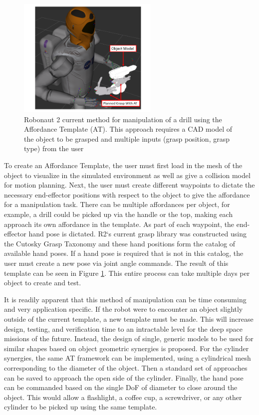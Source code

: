 \documentclass[runningheads,a4paper]{llncs}
\begin{document}
   \begin{figure}[t]
      \centering
      \includegraphics[width=0.6\textwidth]{drill_at2}
      \caption{Robonaut 2 current method for manipulation of a drill using the Affordance Template (AT).  This approach requires a CAD model of the object to be grasped and multiple inputs (grasp position, grasp type) from the user}
      \label{at_example}
   \end{figure}

To create an Affordance Template, the user must first load in the mesh of the object to visualize in the simulated environment as well as give a collision model for motion planning. Next, the user must create different waypoints to dictate the necessary end-effector positions with respect to the object to give the affordance for a manipulation task. There can be multiple affordances per object, for example, a drill could be picked up via the handle or the top, making each approach its own affordance in the template. As part of each waypoint, the end-effector hand pose is dictated. R2`s current grasp library was constructed using the Cutosky Grasp Taxonomy \cite{Cutkosky} and these hand positions form the catalog of available hand poses. If a hand pose is required that is not in this catalog, the user must create a new pose via joint angle commands. The result of this template can be seen in Figure \ref{at_example}. This entire process can take multiple days per object to create and test.

It is readily apparent that this method of manipulation can be time consuming and very application specific. If the robot were to encounter an object slightly outside of the current template, a new template must be made. This will increase design, testing, and verification time to an intractable level for the deep space missions of the future. Instead, the design of single, generic models to be used for similar shapes based on object geometric synergies is proposed. For the cylinder synergies, the same AT framework can be implemented, using a cylindrical mesh corresponding to the diameter of the object. Then a standard set of approaches can be saved to approach the open side of the cylinder. Finally, the hand pose can be commanded based on the single DoF of diameter to close around the object. This would allow a flashlight, a coffee cup, a screwdriver, or any other cylinder to be picked up using the same template.
\end{document}
